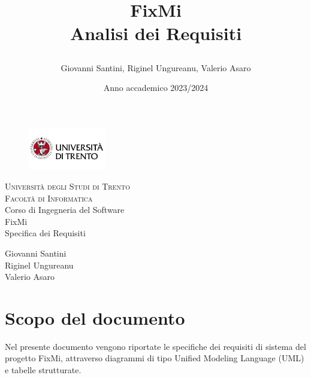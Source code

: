 \documentclass{report}
\title{

	FixMi \\
	Analisi dei Requisiti
}
\author{Giovanni Santini, Riginel Ungureanu, Valerio Asaro}
\date{Anno accademico 2023/2024}
\begin{document}
	
	
	\begin{titlepage}
		\begin{figure}[t]
			\centering\includegraphics[width=0.3\textwidth]{unitn-logo}
		\end{figure}
		\begin{center}
			\textsc{ \LARGE{Università degli Studi di Trento \\}}
			\textsc{ \LARGE{Facoltà di Informatica\\ }}
			\textnormal{ \LARGE{Corso di Ingegneria del Software\\}}
			\vspace{30mm}
			\fontsize{10mm}{7mm}\selectfont 
			\textup{FixMi \\ Specifica dei Requisiti}\\
		\end{center}
		
		\vspace{25mm}
		
		\centering
		\large Giovanni Santini\\ Riginel Ungureanu \\ Valerio Asaro
		
		\vspace{20mm}
		
		
	\end{titlepage}
	
	
	
	
	\pagestyle{fancy}
	\fancyhead[R]{\chaptername\ \thechapter}  %
	
	\tableofcontents
	\newpage
	
	
	
	\section{Scopo del documento}
	
	Nel presente documento vengono riportate le specifiche dei requisiti di sistema del progetto FixMi,  attraverso diagrammi di tipo Unified Modeling Language (UML) e tabelle strutturate.\\
	
\end{document}
